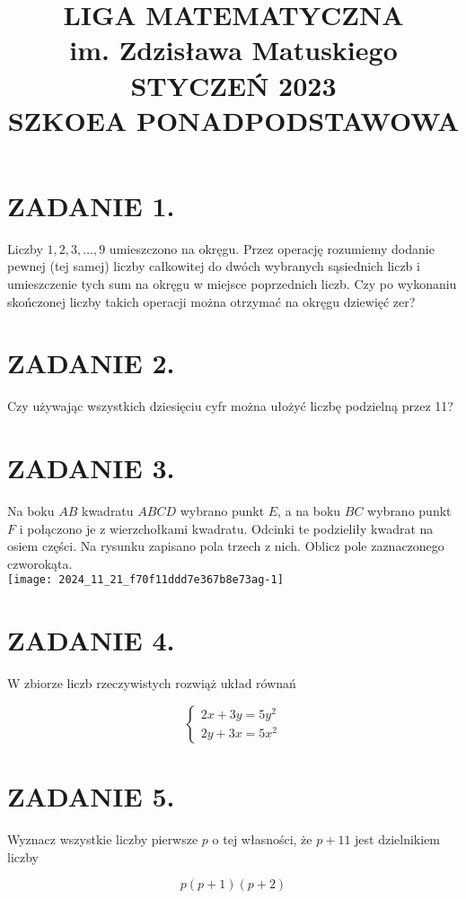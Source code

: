 \documentclass[10pt]{article}
\title{LIGA MATEMATYCZNA \\
 im. Zdzisława Matuskiego \\
 STYCZEŃ 2023 \\
 SZKOEA PONADPODSTAWOWA }
\author{}
\date{}
\begin{document}
\maketitle
\section*{ZADANIE 1.}
Liczby \(1,2,3, \ldots, 9\) umieszczono na okręgu. Przez operację rozumiemy dodanie pewnej (tej samej) liczby całkowitej do dwóch wybranych sąsiednich liczb i umieszczenie tych sum na okręgu w miejsce poprzednich liczb. Czy po wykonaniu skończonej liczby takich operacji można otrzymać na okręgu dziewięć zer?

\section*{ZADANIE 2.}
Czy używając wszystkich dziesięciu cyfr można ułożyć liczbę podzielną przez 11?

\section*{ZADANIE 3.}
Na boku \(A B\) kwadratu \(A B C D\) wybrano punkt \(E\), a na boku \(B C\) wybrano punkt \(F\) i połączono je z wierzchołkami kwadratu. Odcinki te podzieliły kwadrat na osiem części. Na rysunku zapisano pola trzech z nich. Oblicz pole zaznaczonego czworokąta.\\
\texttt{[image: 2024\_11\_21\_f70f11ddd7e367b8e73ag-1]}

\section*{ZADANIE 4.}
W zbiorze liczb rzeczywistych rozwiąż układ równań

\[
\left\{\begin{array}{l}
2 x+3 y=5 y^{2} \\
2 y+3 x=5 x^{2}
\end{array}\right.
\]

\section*{ZADANIE 5.}
Wyznacz wszystkie liczby pierwsze \(p\) o tej własności, że \(p+11\) jest dzielnikiem liczby

\[
p(p+1)(p+2)
\]
\end{document}
